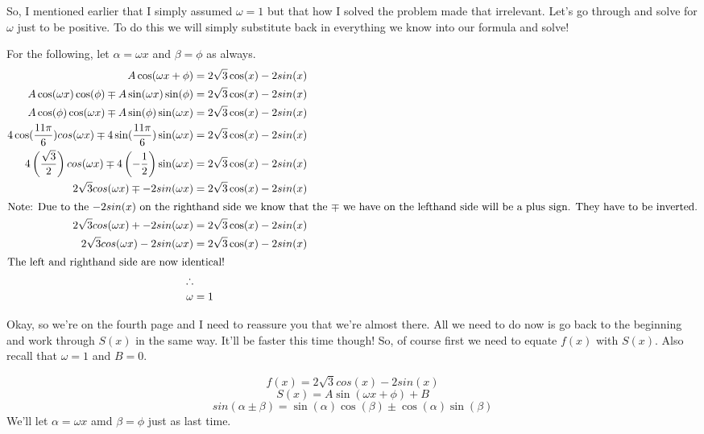 \documentclass[10pt,letterpaper]{amspset}
\begin{document}
\begin{solution}
    So, I mentioned earlier that I simply assumed $\omega =1$ but that how I solved the problem made that irrelevant. Let's go through and solve for $\omega$ just to be positive. To do this we will simply substitute back in everything we know into our formula and solve!
    
    For the following, let $\alpha = \omega x$ and $\beta = \phi$ as always.
    \begin{align}
        A \cos(\omega x + \phi) &= 2\sqrt{3}\cos(x) - 2sin(x) \\
        A \cos(\omega x) \cos(\phi) \mp A \sin(\omega x) \sin(\phi) &= 2\sqrt{3}\cos(x) - 2sin(x) \\
        A \cos(\phi) \cos(\omega x) \mp A \sin(\phi) \sin(\omega x) &= 2\sqrt{3}\cos(x) - 2sin(x) \\
        4 \cos(\frac{11\pi}{6}) cos(\omega x) \mp 4 \sin(\frac{11\pi}{6}) \sin(\omega x) &= 2\sqrt{3}\cos(x) - 2sin(x) \\
        4 \left( \frac{\sqrt{3}}{2} \right) cos(\omega x) \mp 4 \left( - \frac{1}{2} \right) \sin(\omega x) &= 2\sqrt{3}\cos(x) - 2sin(x) \\
        2\sqrt{3} cos(\omega x) \mp -2 sin(\omega x) &= 2\sqrt{3}\cos(x) - 2sin(x) \\
        \intertext{Note: Due to the $-2sin(x)$ on the righthand side we know that the $\mp$ we have on the lefthand side will be a plus sign. They have to be inverted.}
        2\sqrt{3} cos(\omega x) + -2 sin(\omega x) &= 2\sqrt{3}\cos(x) - 2sin(x) \\
        2\sqrt{3} cos(\omega x) -2 sin(\omega x) &= 2\sqrt{3}\cos(x) - 2sin(x) \\
        \intertext{The left and righthand side are now identical!}
        \therefore \\
        \omega &= 1
    \end{align}
    
    Okay, so we're on the fourth page and I need to reassure you that we're almost there. All we need to do now is go back to the beginning and work through $S(x)$ in the same way. It'll be faster this time though! So, of course first we need to equate $f(x)$ with $S(x)$. Also recall that $\omega = 1$ and $B = 0$.
    
    \[ f(x) = 2\sqrt{3}cos(x) - 2sin(x)\]
    \[ S(x) = A \sin(\omega x + \phi) + B\]
    \[ sin(\alpha \pm \beta) = \sin(\alpha) \cos(\beta) \pm \cos(\alpha) \sin(\beta) \]
    We'll let $\alpha = \omega x$ amd $\beta = \phi$ just as last time.
    

\end{solution}
\end{document}
